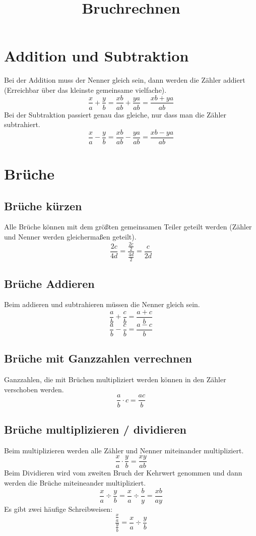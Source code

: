 \documentclass[11pt, a4paper]{article}
\begin{document}
\title{Bruchrechnen}
\maketitle

\thispagestyle{empty}


\tableofcontents

\newpage

\section{Addition und Subtraktion}
Bei der Addition muss der Nenner gleich sein, dann werden die Zähler addiert (Erreichbar über das kleinste gemeinsame vielfache).
\[
	\frac{x}{a} + \frac{y}{b} = \frac{xb}{ab} + \frac{ya}{ab} = \frac{xb+ya}{ab}
\]
Bei der Subtraktion passiert genau das gleiche, nur dass man die Zähler subtrahiert.
\[
	\frac{x}{a} - \frac{y}{b} = \frac{xb}{ab} - \frac{ya}{ab} = \frac{xb-ya}{ab}
\]

\section{Brüche}
\subsection{Brüche kürzen}
Alle Brüche können mit dem größten gemeinsamen Teiler geteilt werden (Zähler und Nenner werden gleichermaßen geteilt).
\[
	\frac{2c}{4d} = \frac{\frac{2c}{2}}{\frac{4d}{2}} = \frac{c}{2d}
\]

\subsection{Brüche Addieren}
Beim addieren und subtrahieren müssen die Nenner gleich sein.
\[
	\frac{a}{b} + \frac{c}{b} = \frac{a+c}{b}
\]
\[
	\frac{a}{b} - \frac{c}{b} = \frac{a-c}{b}
\]
\subsection{Brüche mit Ganzzahlen verrechnen}
Ganzzahlen, die mit Brüchen multipliziert werden können in den Zähler verschoben werden.
\[
	\frac{a}{b} \cdot c = \frac{ac}{b}
\]

\subsection{Brüche multiplizieren / dividieren}
Beim multiplizieren werden alle Zähler und Nenner miteinander multipliziert.
\[
	\frac{x}{a} \cdot \frac{y}{b} = \frac{xy}{ab}
\]
Beim Dividieren wird vom zweiten Bruch der Kehrwert genommen und dann werden die Brüche miteineander multipliziert.
\[
	\frac{x}{a} \div \frac{y}{b} = \frac{x}{a} \div \frac{b}{y} = \frac{xb}{ay}
\]
Es gibt zwei häufige Schreibweisen:
\[
	\frac{\frac{x}{a}}{\frac{y}{b}} = \frac{x}{a} \div \frac{y}{b}
\]
\end{document}
